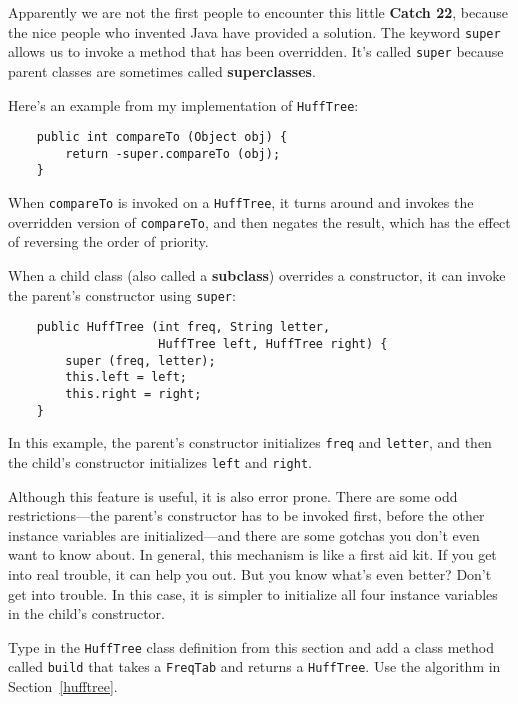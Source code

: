 
Apparently we are not the first people to encounter this little
{\bf Catch 22}, because the nice people who invented Java have provided
a solution.  The keyword {\tt super} allows us to invoke a method
that has been overridden.  It's called {\tt super} because parent
classes are sometimes called {\bf superclasses}.


Here's an example from my implementation of {\tt HuffTree}:

\begin{verbatim}
    public int compareTo (Object obj) {
        return -super.compareTo (obj);
    }
\end{verbatim}

When {\tt compareTo} is invoked on a {\tt HuffTree}, it turns
around and invokes the overridden version of {\tt compareTo},
and then negates the result, which has the effect of reversing
the order of priority.


When a child class (also called a {\bf subclass}) overrides
a constructor, it can invoke the parent's constructor using
{\tt super}:

\begin{verbatim}
    public HuffTree (int freq, String letter, 
                     HuffTree left, HuffTree right) {
        super (freq, letter);
        this.left = left;
        this.right = right;
    }
\end{verbatim}

In this example, the parent's constructor initializes {\tt freq}
and {\tt letter}, and then the child's constructor initializes
{\tt left} and {\tt right}.

Although this feature is useful, it is also error prone.  There
are some odd restrictions---the parent's constructor has to be
invoked first, before the other instance variables are
initialized---and there are some gotchas you don't even want to
know about.  In general, this mechanism is like a first aid kit.
If you get into real trouble, it can help you out.  But you
know what's even better?  Don't get into trouble.  In this case,
it is simpler to initialize all four instance variables in
the child's constructor.

\begin{exercise}
Type in the {\tt HuffTree} class definition from this section
and add a class method called {\tt build} that takes a {\tt FreqTab}
and returns a {\tt HuffTree}.  Use the algorithm in Section~\ref{hufftree}.
\end{exercise}


